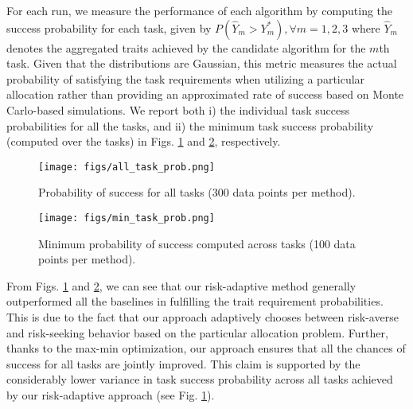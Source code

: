 \documentclass[letterpaper, 10 pt, conference]{ieeeconf}  %
\begin{document}
For each run, we measure the performance of each algorithm by computing the success probability for each task, given by $P(\hat{Y}_m > Y^*_m), \forall m=1,2,3$ where $\hat{Y}_m$ denotes the aggregated traits achieved by the candidate algorithm for the $m$th task. Given that the distributions are Gaussian, this metric measures the actual probability of satisfying the task requirements when utilizing a particular allocation rather than providing an approximated rate of success based on Monte Carlo-based simulations.
We report both i) the individual task success probabilities for all the tasks, and ii) the minimum task success probability (computed over the tasks) in Figs. \ref{fig:task_probabilities} and \ref{fig:min_task_probabilities}, respectively. 

\begin{figure}[ht]
    \centering
    \texttt{[image: figs/all\_task\_prob.png]}
    \caption{Probability of success for all tasks (300 data points per method).}
    \label{fig:task_probabilities}
\end{figure}

\begin{figure}[ht]
    \centering
    \texttt{[image: figs/min\_task\_prob.png]}
    \caption{Minimum probability of success computed across tasks (100 data points per method).}
    \label{fig:min_task_probabilities}
\end{figure}

From Figs. \ref{fig:task_probabilities} and \ref{fig:min_task_probabilities}, we can see that our risk-adaptive method generally outperformed all the baselines in fulfilling the trait requirement probabilities. This is due to the fact that our approach adaptively chooses between risk-averse and risk-seeking behavior based on the particular allocation problem. Further, thanks to the max-min optimization, our approach ensures that all the chances of success for all tasks are jointly improved. This claim is supported by the considerably lower variance in task success probability across all tasks achieved by our risk-adaptive approach (see Fig. \ref{fig:task_probabilities}).
\end{document}
